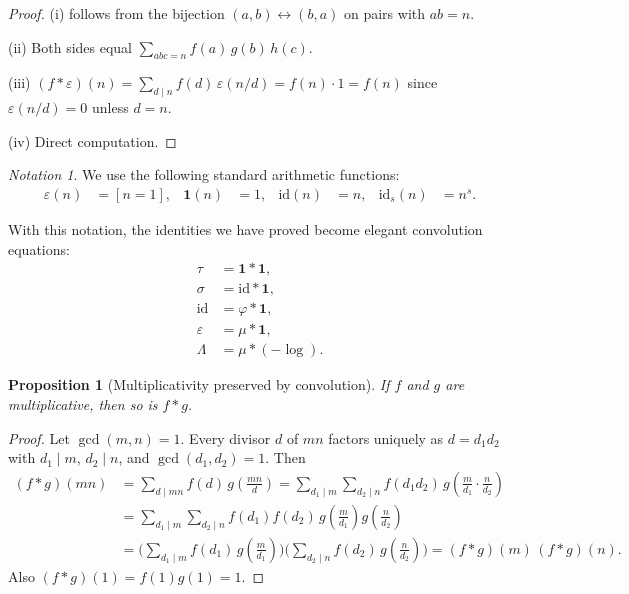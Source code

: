 \documentclass[12pt,a4paper,openany]{book}
\theoremstyle{definition}
\theoremstyle{plain}
\newtheorem{proposition}[definition]{Proposition}
\theoremstyle{remark}
\newtheorem{notation}[definition]{Notation}
\begin{document}
\begin{proof}
(i) follows from the bijection $(a,b) \leftrightarrow (b,a)$ on pairs with $ab=n$.

(ii) Both sides equal $\sum_{abc=n} f(a)\,g(b)\,h(c)$.

(iii) $(f\ast\varepsilon)(n) = \sum_{d\mid n} f(d)\,\varepsilon(n/d) = f(n)\cdot 1 = f(n)$
since $\varepsilon(n/d) = 0$ unless $d=n$.

(iv) Direct computation.
\end{proof}

\begin{notation}\label{not:standard-functions}
We use the following standard arithmetic functions:
\begin{align*}
  \varepsilon(n) &= [n=1], & \mathbf{1}(n) &= 1, &
  \mathrm{id}(n) &= n, & \mathrm{id}_s(n) &= n^s.
\end{align*}
\end{notation}

With this notation, the identities we have proved become elegant convolution
equations:
\begin{align}
  \tau &= \mathbf{1} \ast \mathbf{1},    \label{eq:tau-conv} \\
  \sigma &= \mathrm{id} \ast \mathbf{1}, \label{eq:sigma-conv} \\
  \mathrm{id} &= \varphi \ast \mathbf{1}, \label{eq:phi-conv} \\
  \varepsilon &= \mu \ast \mathbf{1},     \label{eq:mu-conv} \\
  \Lambda &= \mu \ast (-\log).            \label{eq:mangoldt-conv}
\end{align}

\begin{proposition}[Multiplicativity preserved by convolution]\label{prop:mult-conv}
If $f$ and $g$ are multiplicative, then so is $f \ast g$.
\end{proposition}

\begin{proof}
Let $\gcd(m,n)=1$.  Every divisor $d$ of $mn$ factors uniquely as $d=d_1 d_2$
with $d_1 \mid m$, $d_2 \mid n$, and $\gcd(d_1,d_2)=1$.
Then
\begin{align*}
  (f\ast g)(mn) &= \sum_{d\mid mn} f(d)\,g\!\left(\frac{mn}{d}\right)
  = \sum_{d_1\mid m}\sum_{d_2\mid n}
    f(d_1 d_2)\,g\!\left(\frac{m}{d_1}\cdot\frac{n}{d_2}\right) \\
  &= \sum_{d_1\mid m}\sum_{d_2\mid n}
    f(d_1)f(d_2)\,g\!\left(\frac{m}{d_1}\right)g\!\left(\frac{n}{d_2}\right) \\
  &= \biggl(\sum_{d_1\mid m}f(d_1)\,g\!\left(\frac{m}{d_1}\right)\!\biggr)
     \biggl(\sum_{d_2\mid n}f(d_2)\,g\!\left(\frac{n}{d_2}\right)\!\biggr)
  = (f\ast g)(m)\,(f\ast g)(n).
\end{align*}
Also $(f\ast g)(1) = f(1)g(1) = 1$.
\end{proof}
\end{document}
